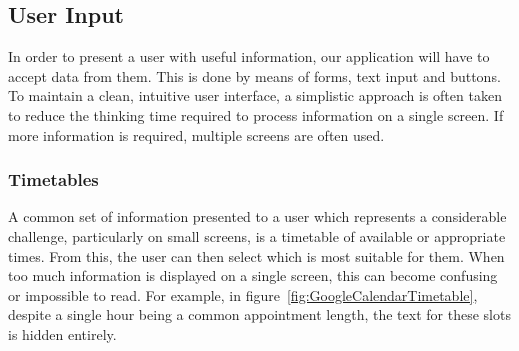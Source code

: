 \subsection{User Input}
\label{sub:user_input}

In order to present a user with useful information, our application will have
to accept data from them. This is done by means of forms, text input and
buttons. To maintain a clean, intuitive user interface, a simplistic approach
is often taken to reduce the thinking time required to process information on a
single screen. If more information is required, multiple screens are often
used.

\subsubsection{Timetables}
\label{ssub:timetables}

A common set of information presented to a user which represents a considerable
challenge, particularly on small screens, is a timetable of available or
appropriate times. From this, the user can then select which is most suitable
for them. When too much information is displayed on a single screen, this can
become confusing or impossible to read. For example, in
figure~\ref{fig:GoogleCalendarTimetable}\cite{GoogleCalendar}, despite a single
hour being a common appointment length, the text for these slots is hidden
entirely.

